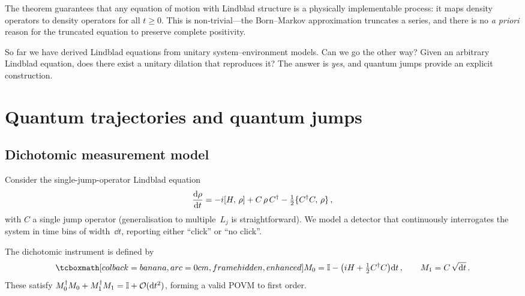 \begin{keyresult}
  The theorem guarantees that any equation of motion with Lindblad
  structure is a physically implementable process: it maps density
  operators to density operators for all $t \ge 0$.  This is
  non-trivial---the Born--Markov approximation truncates a series,
  and there is no \emph{a priori} reason for the truncated equation
  to preserve complete positivity.
\end{keyresult}

\begin{intuition}
  So far we have derived Lindblad equations from unitary
  system--environment models.  Can we go the other way?  Given an
  arbitrary Lindblad equation, does there exist a unitary dilation
  that reproduces it?  The answer is \emph{yes}, and quantum jumps
  provide an explicit construction.
\end{intuition}

\section{Quantum trajectories and quantum jumps}%
\label{sec:quantum-jumps}

\subsection{Dichotomic measurement model}\label{sec:dichotomic}

Consider the single-jump-operator Lindblad equation
\begin{equation}\label{eq:single-lindblad}
  \frac{\mathrm{d}\rho}{\mathrm{d} t}
  = -i[H,\,\rho]
    + C\,\rho\, C^\dagger
    - \tfrac{1}{2}\{C^\dagger C,\,\rho\}\,,
\end{equation}
with $C$ a single jump operator (generalisation to multiple~$L_j$ is
straightforward).  We model a detector that continuously interrogates
the system in time bins of width~$\dd t$, reporting either ``click''
or ``no click''.

\begin{definition}\label{def:jump-measurement}
  The dichotomic instrument is defined by
  \begin{equation}\label{eq:measurement-ops}
    \eqbox{M_0
    = \One - \bigl(iH + \tfrac{1}{2}C^\adj C\bigr)\dd t}\,,
    \qquad
    M_1 = C\,\sqrt{\dd t}\,.
  \end{equation}
  These satisfy
  $M_0^\dagger M_0 + M_1^\dagger M_1 = \mathbb{I} + \mathcal{O}(\mathrm{d} t^2)$,
  forming a valid POVM to first order.
\end{definition}

